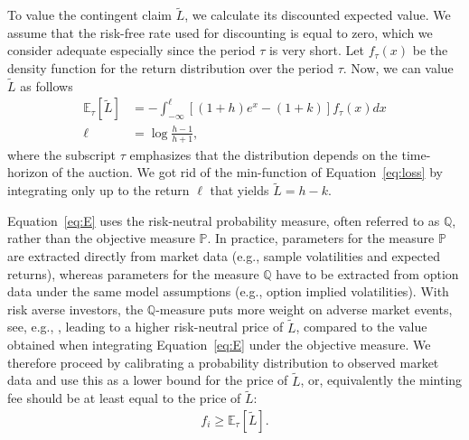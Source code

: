 \documentclass[english,11pt]{article}
\begin{document}
To value the contingent claim $\tilde{L}$, we calculate its discounted expected
value. We assume that the risk-free rate used for discounting is equal to zero,
which we consider adequate especially since the period $\tau$ is very short.
Let $f_{\tau}(x)$ be the density function for the return distribution over the period $\tau$. Now, we can value $\tilde{L}$ as follows
\begin{align}
\mathbb{E}_{\tau}\left[\tilde{L} \right] &= - \int_{-\infty}^{\ell} \left[(1 + h) e^{x} - (1+k) \right] f_{\tau}(x) dx\label{eq:E}\\
\ell &= \log \frac{h-1}{h+1},
\end{align}
where the subscript $\tau$ emphasizes that the distribution depends on the time-horizon of the auction. We got rid of the min-function of Equation~\eqref{eq:loss} by
integrating only up to the return $\ell$ that yields $\tilde{L}=h-k$.

Equation~\eqref{eq:E} uses the risk-neutral probability measure, often referred to as
$\mathbb{Q}$, rather than the objective measure $\mathbb{P}$. In practice,
parameters for the measure $\mathbb{P}$ are extracted directly from market data
(e.g., sample volatilities and expected returns), whereas
parameters for the measure $\mathbb{Q}$ have to be extracted from option data
under the same model assumptions (e.g., option implied volatilities). 
With risk averse investors, the $\mathbb{Q}$-measure puts more
weight on adverse market events, see, e.g., \cite{breeden1978prices}, leading
to a higher risk-neutral price of $\tilde{L}$, compared to the value obtained
when integrating Equation~\eqref{eq:E} under the objective measure.
We therefore proceed by calibrating a probability distribution to observed
market data and use this as a lower bound for the price of $\tilde{L}$, or,
equivalently the minting fee should be at least equal to the price of $\tilde{L}$:
\begin{align}
f_i \geq \mathbb{E}_{\tau}\left[\tilde{L} \right].
\end{align}
\end{document}

